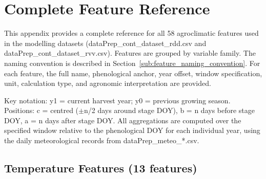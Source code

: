 
\chapter{Complete Feature Reference}\label{app:complete_feature_reference}

This appendix provides a complete reference for all 58 agroclimatic features used in the modelling datasets (dataPrep\_cont\_dataset\_rdd.csv and dataPrep\_cont\_dataset\_rvv.csv). Features are grouped by variable family. The naming convention is described in Section~\ref{sub:feature_naming_convention}. For each feature, the full name, phenological anchor, year offset, window specification, unit, calculation type, and agronomic interpretation are provided.

Key notation: y1 = current harvest year; y0 = previous growing season. Positions: c = centred ($\pm$n/2 days around stage DOY), b = n days before stage DOY, a = n days after stage DOY. All aggregations are computed over the specified window relative to the phenological DOY for each individual year, using the daily meteorological records from dataPrep\_meteo\_*.csv.


\section{Temperature Features (13 features)}\label{app_sec:temperature_features_13_features}

